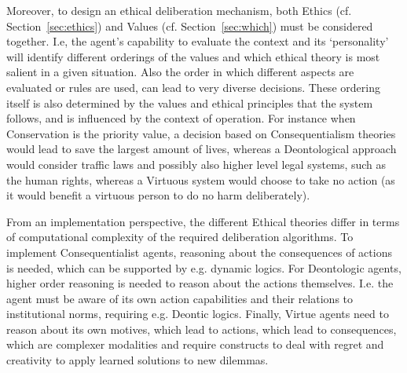 \documentclass[twocolumn]{article}
\begin{document}
Moreover, to design an ethical deliberation mechanism, both Ethics (cf. Section~\ref{sec:ethics}) and Values (cf. Section~\ref{sec:which}) must be considered together. I.e, the agent's capability to evaluate the context and its `personality' will identify different orderings of the values and which ethical theory is most salient in a given situation. Also the order in which different aspects are evaluated or rules are used, can lead to very diverse decisions. These ordering itself is also determined by the values and ethical principles that the system follows, and is influenced by the context of operation. %
For instance when Conservation is the priority value, a decision based on Consequentialism theories would lead to save the largest amount of lives, whereas a Deontological approach would consider traffic laws and possibly also higher level legal systems, such as the human rights, whereas a Virtuous system would choose to take no action (as it would benefit a virtuous person to do no harm deliberately). 

From an implementation perspective, 
the different Ethical theories differ in terms of computational complexity of the required deliberation algorithms. To implement Consequentialist agents, reasoning about the consequences of actions is needed, which can be supported by e.g. dynamic logics. For Deontologic agents, higher order reasoning is needed to reason about the actions themselves. I.e. the agent must be aware of its own action capabilities and their relations to institutional norms, requiring e.g. Deontic logics. Finally, Virtue agents need to reason about its own motives, which lead to actions, which lead to consequences, which are complexer modalities and require constructs to deal with regret and creativity to apply learned solutions to new dilemmas. %
\end{document}
